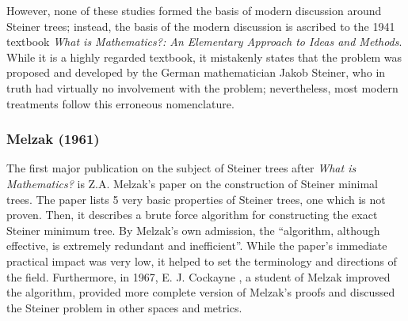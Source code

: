 \documentclass{mpaper}
\begin{document}
However, none of these studies formed the basis of modern discussion around Steiner trees; instead, the basis of the modern discussion is ascribed to the 1941 textbook \emph{What is Mathematics?: An Elementary Approach to Ideas and Methods}\cite{courant1996mathematics}. While it is a highly regarded textbook, it mistakenly states that the problem was proposed and developed by the German mathematician Jakob Steiner, who in truth had virtually no involvement with the problem; nevertheless, most modern treatments follow this erroneous nomenclature.

\subsubsection{Melzak (1961) \cite{melzak_1961}}
The first major publication on the subject of Steiner trees after \emph{What is Mathematics?} is Z.A. Melzak's paper on the construction of Steiner minimal trees. The paper lists 5 very basic properties of Steiner trees, one which is not proven. Then, it describes a brute force algorithm for constructing the exact Steiner minimum tree. By Melzak's own admission, the ``algorithm, although effective, is extremely redundant and inefficient''. While the paper's immediate practical impact was very low, it helped to set the terminology and directions of the field. Furthermore, in 1967,  E. J. Cockayne \cite{cockayne_1967}, a student of Melzak improved the algorithm, provided more complete version of Melzak's proofs and discussed the Steiner problem in other spaces and metrics.
\end{document}
